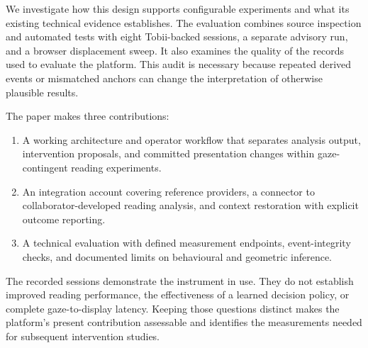 We investigate how this design supports configurable experiments and what its existing technical evidence establishes. The evaluation combines source inspection and automated tests with eight Tobii-backed sessions, a separate advisory run, and a browser displacement sweep. It also examines the quality of the records used to evaluate the platform. This audit is necessary because repeated derived events or mismatched anchors can change the interpretation of otherwise plausible results.

The paper makes three contributions:
\begin{enumerate}
  \item A working architecture and operator workflow that separates analysis output, intervention proposals, and committed presentation changes within gaze-contingent reading experiments.
  \item An integration account covering reference providers, a connector to collaborator-developed reading analysis, and context restoration with explicit outcome reporting.
  \item A technical evaluation with defined measurement endpoints, event-integrity checks, and documented limits on behavioural and geometric inference.
\end{enumerate}

The recorded sessions demonstrate the instrument in use. They do not establish improved reading performance, the effectiveness of a learned decision policy, or complete gaze-to-display latency. Keeping those questions distinct makes the platform's present contribution assessable and identifies the measurements needed for subsequent intervention studies.
